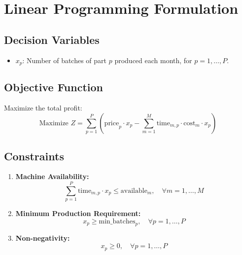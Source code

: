 \documentclass{article}
\begin{document}
\section*{Linear Programming Formulation}

\subsection*{Decision Variables}
\begin{itemize}
    \item \( x_p \): Number of batches of part \( p \) produced each month, for \( p = 1, \ldots, P \).
\end{itemize}

\subsection*{Objective Function}
Maximize the total profit:
\[
\text{Maximize } Z = \sum_{p=1}^{P} \left( \text{price}_p \cdot x_p - \sum_{m=1}^{M} \text{time}_{m,p} \cdot \text{cost}_m \cdot x_p \right)
\]

\subsection*{Constraints}
\begin{enumerate}
    \item \textbf{Machine Availability:}
    \[
    \sum_{p=1}^{P} \text{time}_{m,p} \cdot x_p \leq \text{available}_m, \quad \forall m = 1, \ldots, M
    \]
    \item \textbf{Minimum Production Requirement:}
    \[
    x_p \geq \text{min\_batches}_p, \quad \forall p = 1, \ldots, P
    \]
    \item \textbf{Non-negativity:}
    \[
    x_p \geq 0, \quad \forall p = 1, \ldots, P
    \]
\end{enumerate}
\end{document}
